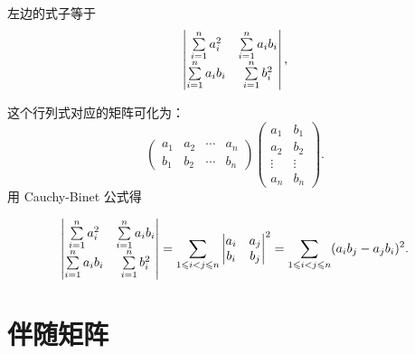 \begin{solution}
    左边的式子等于
    \[ \begin{vmatrix}
        \sum_{i=1}^{n}\limits a_i^2 & \sum_{i=1}^{n}\limits a_i b_i \\
        \sum_{i=1}^{n}\limits a_i b_i & \sum_{i=1}^{n}\limits b_i^2
    \end{vmatrix}, \]

    这个行列式对应的矩阵可化为：
    \[ \begin{pmatrix}
        a_1 & a_2 & \cdots & a_n \\
        b_1 & b_2 & \cdots & b_n
    \end{pmatrix}
    \begin{pmatrix}
        a_1 & b_1 \\
        a_2 & b_2 \\
        \vdots & \vdots \\
        a_n & b_n
    \end{pmatrix}. \]
    用 Cauchy-Binet 公式得

    \[
    \begin{vmatrix}
        \sum_{i=1}^{n}\limits a_i^2 & \sum_{i=1}^{n}\limits a_i b_i \\
        \sum_{i=1}^{n}\limits a_i b_i & \sum_{i=1}^{n}\limits b_i^2
    \end{vmatrix}
    = \sum_{1 \leqslant i < j \leqslant n}
    \begin{vmatrix}
        a_i & a_j \\
        b_i & b_j
    \end{vmatrix}^2
    = \sum_{1 \leqslant i < j \leqslant n} (a_i b_j - a_j b_i)^2.
    \]
\end{solution}

\section{伴随矩阵}

